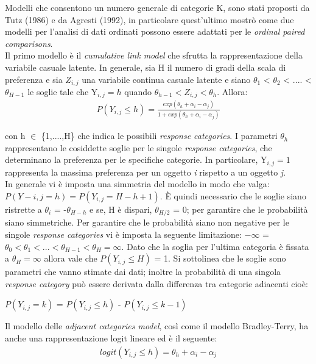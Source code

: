 Modelli che consentono un numero generale di categorie K, sono stati proposti da Tutz (1986) e da Agresti (1992), in particolare quest'ultimo mostrò come due modelli per l'analisi di dati ordinati possono essere adattati per le \emph{ordinal paired comparisons}.\\

Il primo modello è il \emph{cumulative link model} che sfrutta la rappresentazione della variabile casuale latente. In generale, sia H il numero di gradi della scala di preferenza e sia $Z_{i,j}$ una variabile continua casuale latente e siano $\theta_{1} $ < $\theta_{2}$ < .... < $\theta_{H-1}$ le soglie tale che Y$_{i,j} = h$ quando $\theta_{h-1} < Z_{i,j} < \theta_{h}$. Allora:
\begin{align}
	P(Y_{i,j}\leq h) =  \frac{exp(\theta_{h} + \alpha_{i} - \alpha_{j})}{1 + exp(\theta_{h} + \alpha_{i} - \alpha_{j})} \label{for:3.2.1}
\end{align}

con h $\in$ \{1,....,H\} che indica le possibili \emph{response categories}. I parametri $\theta_{h}$ rappresentano le cosiddette soglie per le singole \emph{response categories}, che determinano la preferenza per le specifiche categorie. In particolare, Y$_{i,j} = 1$ rappresenta la massima preferenza per un oggetto \textit{i} rispetto a un oggetto \textit{j}.\\
In generale vi è imposta una simmetria del modello in modo che valga: $P(Y-{i,j} = h) = P(Y_{i,j} = H - h + 1)$. È quindi necessario che le soglie siano ristrette a $\theta_{i}$ = -$\theta_{H-h}$ e se, H è dispari, $\theta_{H/2}$ = 0; per garantire che le probabilità siano simmetriche. Per garantire che le probabilità siano non negative per le singole \emph{response categories} vi è imposta la seguente limitazione: $-\infty$ = $\theta_{0} < \theta_{1} < ... < \theta_{H-1} < \theta_{H} = \infty$. Dato che la soglia per l'ultima categoria è fissata a $\theta_{H} = \infty$ allora vale che $P(Y_{i,j} \leq H)$ = 1. Si sottolinea che le soglie sono parametri che vanno stimate dai dati; inoltre la probabilità di una singola \emph{response category} può essere derivata dalla differenza tra categorie adiacenti cioè:
\begin{center}
	  $P(Y_{i,j} = k)$ = $P(Y_{i,j} \leq h)$ - $P(Y_{i,j} \leq k - 1)$
\end{center}

Il modello delle \emph{adjacent categories model}, così come il modello Bradley-Terry, ha anche una rappresentazione logit lineare ed è il seguente:
\begin{align}
	logit(Y_{i,j}\leq h) =  \theta_{h} + \alpha_i - \alpha_j 
\end{align}

